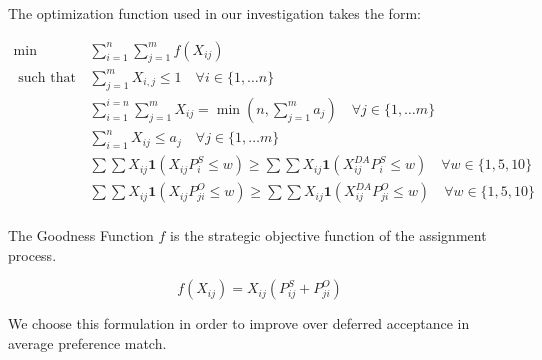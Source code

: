 The optimization function used in our investigation takes the form:

\begin{align}
\min \qquad & \sum_{i = 1}^{n} \sum_{j = 1}^{m} f(X_{ij}) \label{obj_func}\\
\text{ such that } \qquad & \sum_{j=1}^m X_{i,j} \leq 1 \quad  \forall i \in \{1, \dots n\} \label{one_job}\\
& \sum_{i = 1}^{i=n} \sum_{j = 1}^{m}X_{ij} = \min \left(n,\sum_{j = 1}^{m}a_j \right) \quad  \forall j \in \{1, \dots m\}  \label{all_filled}\\
& \sum_{i=1}^n X_{ij} \leq a_j \quad  \forall j \in \{1, \dots m\} \label{capacity} \\
& \sum \sum X_{ij}\mathbf{1}(X_{ij} P^S_{i} \leq w) \geq \sum \sum X_{ij}\mathbf{1}(X^{DA}_{ij} P^S_{i} \leq w) \quad \forall w \in \{1,5,10\} \\ \label{s_da}
& \sum \sum X_{ij}\mathbf{1}(X_{ij} P^O_{ji} \leq w) \geq \sum \sum X_{ij}\mathbf{1}(X^{DA}_{ij} P^O_{ji} \leq w) \quad \forall w \in \{1,5,10\} \\ \label{o_da}
\end{align}

The Goodness Function $f$ is the strategic objective function of the assignment process. 

\[f(X_{ij}) = X_{ij}(P^S_{ij} + P^O_{ji})\]

We choose this formulation in order to improve over deferred acceptance in average preference match.
